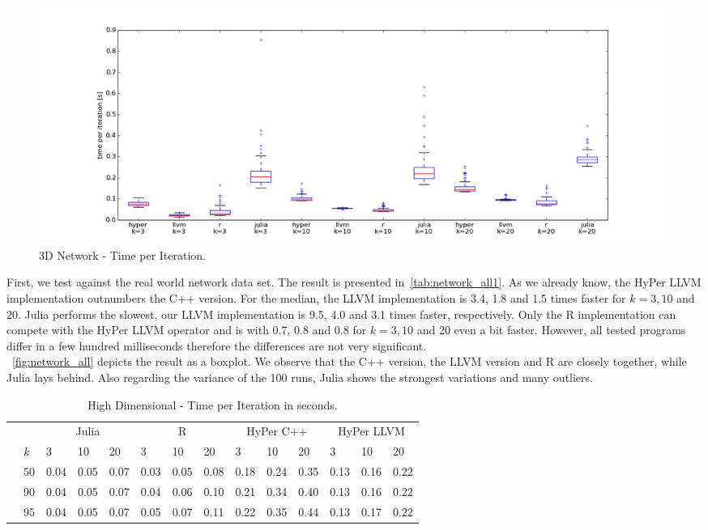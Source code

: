 \begin{figure}[htsb]
  \centerline{
  \includegraphics[scale=0.4, trim="0cm 1cm 0cm 0cm"]{figures/charts/network_all}
  }
  \caption[3D Network - Time per Iteration]{3D Network - Time per Iteration.}
  \label{fig:network_all}
\end{figure}

First, we test against the real world network data set. The result is presented in~\autoref{tab:network_all1}. As we already know, the HyPer LLVM implementation outnumbers the C++ version. For the median, the LLVM implementation is 3.4, 1.8 and 1.5 times faster for $k = 3, 10$ and $20$. Julia performs the slowest, our LLVM implementation is 9.5, 4.0 and 3.1 times faster, respectively. Only the R implementation can compete with the HyPer LLVM operator and is with 0.7, 0.8 and 0.8 for $k = 3, 10$ and 20 even a bit faster. However, all tested programs differ in a few hundred milliseconds therefore the differences are not very significant.
\\
~\autoref{fig:network_all} depicts the result as a boxplot. We observe that the C++ version, the LLVM version and R are closely together, while Julia lays behind. Also regarding the variance of the 100 runs, Julia shows the strongest variations and many outliers.

\begin{table}[htsb]
  \caption[High Dimensional - Time per Iteration]{High Dimensional - Time per Iteration in seconds.}
  \label{tab:highdim_all}
  \centering
  \begin{tabular}{l l l ll |l l l |l l l |l l l}
    \toprule
      && \multicolumn{3}{c}{Julia} & \multicolumn{3}{c}{R} & \multicolumn{3}{c}{HyPer C++} & \multicolumn{3}{c}{HyPer LLVM}  \\
      &\emph{k} & 3 & 10 & 20 & 3 & 10 & 20 & 3 & 10 & 20 & 3 & 10 & 20 \\
    \midrule
      \parbox[t]{2mm}{} &50  & 0.04 & 0.05 & 0.07 & 0.03 & 0.05 & 0.08 & 0.18 & 0.24 & 0.35 & 0.13 & 0.16 & 0.22 \\
      &90  & 0.04 & 0.05 & 0.07 & 0.04 & 0.06 & 0.10 & 0.21 & 0.34 & 0.40 & 0.13 & 0.16 & 0.22 \\
      &95  & 0.04 & 0.05 & 0.07 & 0.05 & 0.07 & 0.11 & 0.22 & 0.35 & 0.44 & 0.13 & 0.17 & 0.22 \\
    \bottomrule
  \end{tabular}
\end{table}

